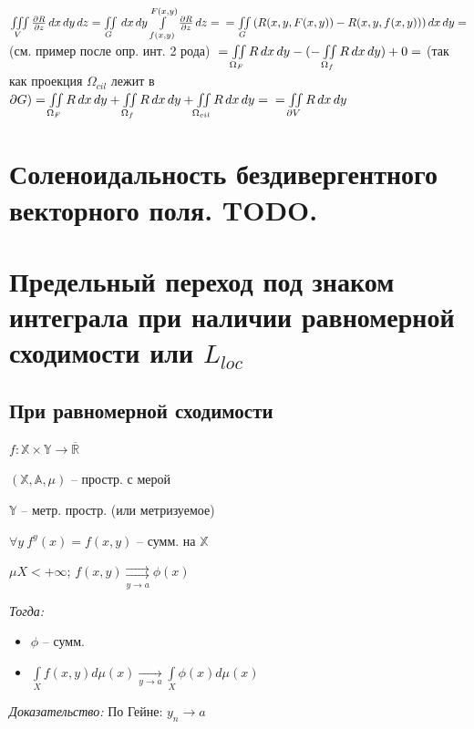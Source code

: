 \documentclass[paper=a4, fontsize=17pt]{article}
\begin{document}
$\iiint\limits_{V}{\frac {\partial R}{\partial z} \,dx\,dy\,dz}
= \iint\limits_G\,dx\,dy\int\limits_{f(x,y)}^{F(x,y)} {\frac {\partial R}{\partial z} \,dz} = \\
= \iint\limits_G{(R(x,y, F(x,y)) - R(x, y, f(x,y)))\,dx\,dy} = $ (см. пример после опр. инт. 2 рода) $\\
= \iint\limits_{\Omega_F}{R\,dx\,dy} - (-\iint\limits_{\Omega_f}{R\,dx\,dy}) + 0  = $ (так как проекция $\Omega_{cil}$ лежит в $\partial G )\\
= \iint\limits_{\Omega_F}{R\,dx\,dy} + \iint\limits_{\Omega_f}{R\,dx\,dy} + \iint\limits_{\Omega_{cil}}{R\,dx\,dy} = \\
= \iint\limits_{\partial V}{R\,dx\,dy}$

\section{Соленоидальность бездивергентного векторного поля. TODO.}

\section{Предельный переход под знаком интеграла при наличии равномерной сходимости или $L_{loc}$}

\subsection{При равномерной сходимости}
$ f : \mathbb{X} \times \mathbb{Y} \rightarrow \overline{\mathbb{R}}$

$ (\mathbb{X}, \mathbb{A}, \mu) $ -- простр. с мерой

$ \mathbb{Y} $ -- метр. простр. (или метризуемое)

$ \forall y ~ f^y(x) = f(x, y) $ -- сумм. на $ \mathbb{X} $

\bigskip

$ \mu X < +\infty $; $ f(x,y) \underset{y \rightarrow a}{\rightrightarrows} \phi(x) $

\emph{Тогда:}

\begin{itemize}
	\item $ \phi $ -- сумм.
	\item $ \int\limits_{X} f(x, y) d\mu (x) \underset{y \rightarrow a}{\longrightarrow} \int\limits_{X} \phi(x) d\mu(x) $
\end{itemize}

\emph{Доказательство:} По Гейне: $ y_n \rightarrow a $
\end{document}
